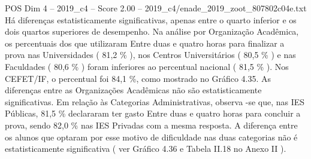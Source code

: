 \begin{textsample}{POS Dim 4 – 2019\_c4 – Score 2.00 – 2019\_c4/enade\_2019\_zoot\_807802c04e.txt}
Há diferenças estatisticamente significativas, apenas entre o quarto inferior e os dois quartos superiores de desempenho.
Na análise por Organização Acadêmica, os percentuais dos que utilizaram Entre duas e quatro horas para finalizar a prova nas Universidades ( 81,2 \% ), nos Centros Universitários ( 80,5 \% ) e nas Faculdades ( 80,6 \% ) foram inferiores ao percentual nacional ( 81,5 \% ).
Nos CEFET/IF, o percentual foi 84,1 \%, como mostrado no Gráfico 4.35.
As diferenças entre as Organizações Acadêmicas não são estatisticamente significativas.
Em relação às Categorias Administrativas, observa -se que, nas IES Públicas, 81,5 \% declararam ter gasto Entre duas e quatro horas para concluir a prova, sendo 82,0 \% nas IES Privadas com a mesma resposta.
A diferença entre os alunos que optaram por esse motivo de dificuldade nas duas categorias não é estatisticamente significativa ( ver Gráfico 4.36 e Tabela II.18 no Anexo II ).

\end{textsample}
